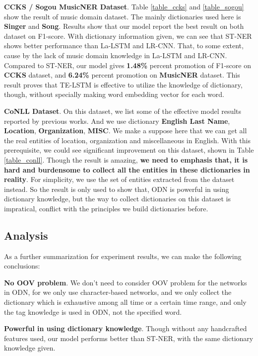 \documentclass[letterpaper]{article} %
\begin{document}
\textbf{CCKS / Sogou MusicNER Dataset}. Table \ref{table_ccks} and \ref{table_sogou} show the result of music domain dataset. The mainly dictionaries used here is \textbf{Singer} and \textbf{Song}. Results show that our model report the best result on both dataset on F1-score. With dictionary information given, we can see that ST-NER shows better performance than La-LSTM and LR-CNN. That, to some extent, cause by the lack of music domain knowledge in La-LSTM and LR-CNN. Compared to ST-NER, our model gives \textbf{1.48\%} percent promotion of F1-score on \textbf{CCKS} dataset, and \textbf{6.24\%} percent promotion on \textbf{MusicNER} dataset. This result proves that TE-LSTM is effective to utilize the knowledge of dictionary, though, without specially making word embedding vector for each word.

\textbf{CoNLL Dataset}. On this dataset, we list some of the effective model results reported by previous works. And we use dictionary \textbf{English Last Name}, \textbf{Location}, \textbf{Organization}, \textbf{MISC}. We make a suppose here that we can get all the real entities of location, organization and miscellaneous in English. With this prerequisite, we could see significant improvement on this dataset, shown in Table \ref{table_conll}. Though the result is amazing, \textbf{we need to emphasis that, it is hard and burdensome to collect all the entities in these dictionaries in reality}. For simplicity, we use the set of entities extracted from the dataset instead. So the result is only used to show that, ODN is powerful in using dictionary knowledge, but the way to collect dictionaries on this dataset is impratical, conflict with the principles we build dictionaries before.

\subsection{Analysis}

As a further summarization for experiment results, we can make the following conclusions:

\textbf{No OOV problem}. We don't need to consider OOV problem for the networks in ODN, for we only use character-based networks, and we only collect the dictionary which is exhaustive among all time or a certain time range, and only the tag knowledge is used in ODN, not the specified word.

\textbf{Powerful in using dictionary knowledge}. Though without any handcrafted features used, our model performs better than ST-NER, with the same dictionary knowledge given.
\end{document}
